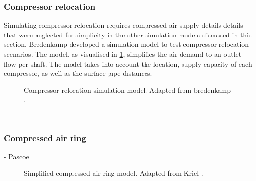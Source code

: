 \subsubsection{Compressor relocation}
Simulating compressor relocation requires compressed air supply details details that were neglected for simplicity in the other simulation models discussed in this section. Bredenkamp \cite{Bredenkamp2013Masters} developed a simulation model to test compressor relocation scenarios. The model, as visualised in \cref{fig: bredenkamp  model}, simplifies the air demand to an outlet flow per shaft. The model takes into account the location, supply capacity of each compressor, as well as the surface pipe distances.
\begin{figure}[h!]
	\centering
	\caption[Compressor relocation simulation model.]{Compressor relocation simulation model. Adapted from bredenkamp \cite{Bredenkamp2013Masters}.}
	\label{fig: bredenkamp  model}
\end{figure} 
\\
\subsubsection{Compressed air ring}
- Pascoe \\
\begin{figure}[h!]
	\centering
	\caption[Simplified compressed air ring model.]{Simplified compressed air ring model. Adapted from Kriel \cite{Pascoe2016Masters}.}
	\label{fig:kriel  model}
\end{figure}

